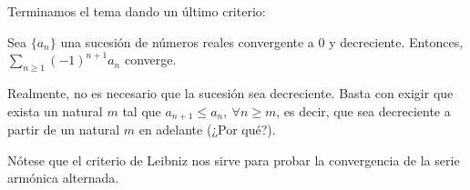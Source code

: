 Terminamos el tema dando un último criterio:
\begin{teo}
    Sea $\{a_n\}$ una sucesión de números reales convergente a $0$ y decreciente. Entonces, $\displaystyle\sum_{n \geq 1} (-1)^{n+1} a_n$ converge.
\end{teo}

Realmente, no es necesario que la sucesión sea decreciente. Basta con exigir que exista un natural $m$ tal que
$a_{n+1} \leq a_n, ~ \forall n \geq m$, es decir, que sea decreciente a partir de un natural $m$ en adelante (¿Por qué?).

Nótese que el criterio de Leibniz nos sirve para probar la convergencia de la serie armónica alternada.